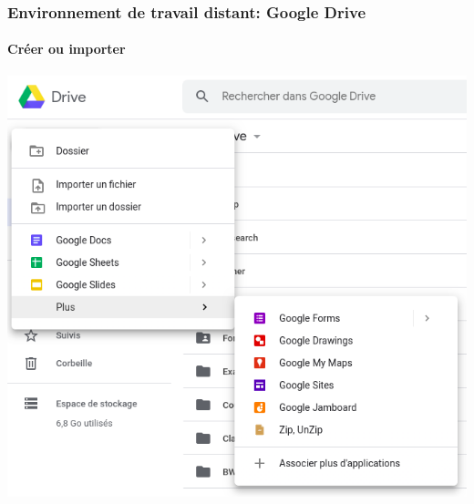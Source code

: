 \documentclass{beamer}
\begin{document}
\begin{frame}
\frametitle{Environnement de travail distant: Google Drive}
\framesubtitle{Créer ou importer}

\begin{center}
	\includegraphics[height=
	.8\textheight]{../img/Bweb01-environnement/drive-new.png}
\end{center}

\end{frame}
\end{document}
